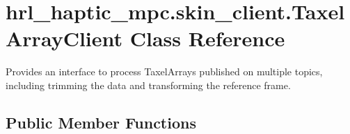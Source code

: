 \hypertarget{classhrl__haptic__mpc_1_1skin__client_1_1_taxel_array_client}{\section{hrl\-\_\-haptic\-\_\-mpc.\-skin\-\_\-client.\-Taxel\-Array\-Client \-Class \-Reference}
\label{classhrl__haptic__mpc_1_1skin__client_1_1_taxel_array_client}
}


\-Provides an interface to process \-Taxel\-Arrays published on multiple topics, including trimming the data and transforming the reference frame.  


\subsection*{\-Public \-Member \-Functions}
